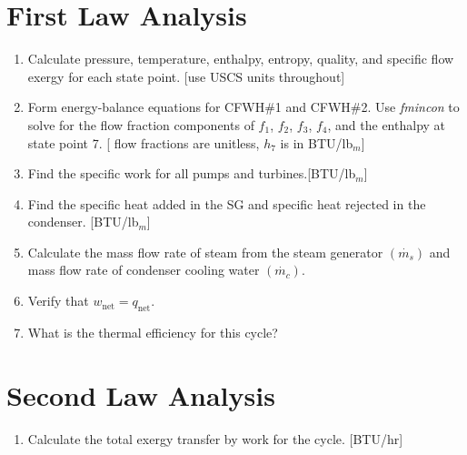 \begin{fullwidth}
\section{First Law Analysis}
\begin{enumerate}
\item Calculate pressure, temperature, enthalpy, entropy, quality, and specific flow exergy for each state point. [use USCS units throughout]

\vspace{1.0 cm}

\item Form energy-balance equations for CFWH\#1 and CFWH\#2.  Use \emph{fmincon} to solve for the flow fraction components of $f_1$, $f_2$, $f_3$, $f_4$, and the enthalpy at state point 7. [ flow fractions are unitless, $h_7$ is in BTU/lb$_m$]

\vspace{1.0cm}

\item Find the specific work for all pumps and turbines.[BTU/lb$_m$]

\vspace{1.0 cm}
\item Find the specific heat added in the SG and specific heat rejected in the condenser. [BTU/lb$_m$]

\vspace{1.0 cm}

\item Calculate the mass flow rate of steam from the steam generator $(\dot{m_{s}})$ and mass flow rate of condenser cooling water $(\dot{m_{c}})$.
\vspace{1.0cm}

\item Verify that $w_{\text{net}} = q_{\text{net}}$.

\vspace{1.0 cm}

\item What is the thermal efficiency for this cycle?

\end{enumerate}

\section{Second Law Analysis}

\begin{enumerate}[resume]
\item Calculate the total exergy transfer by work for the cycle. [BTU/hr]


\end{enumerate}
\end{fullwidth}
